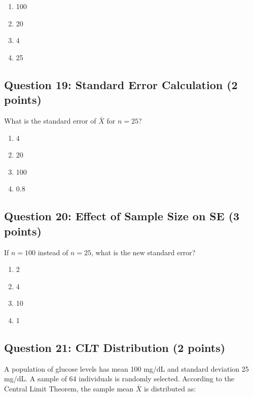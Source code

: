 \documentclass[11pt]{article}
\begin{document}
\begin{enumerate}[label=\Alph*)]
\item 100
\item 20
\item 4
\item 25
\end{enumerate}

\vspace{0.5cm}

\subsection*{Question 19: Standard Error Calculation (2 points)}

What is the standard error of $\bar{X}$ for $n=25$?

\begin{enumerate}[label=\Alph*)]
\item 4
\item 20
\item 100
\item 0.8
\end{enumerate}

\vspace{0.5cm}

\subsection*{Question 20: Effect of Sample Size on SE (3 points)}

If $n=100$ instead of $n=25$, what is the new standard error?

\begin{enumerate}[label=\Alph*)]
\item 2
\item 4
\item 10
\item 1
\end{enumerate}

\vspace{0.5cm}

\subsection*{Question 21: CLT Distribution (2 points)}

A population of glucose levels has mean 100 mg/dL and standard deviation 25 mg/dL. A sample of 64 individuals is randomly selected. According to the Central Limit Theorem, the sample mean $\bar{X}$ is distributed as:
\end{document}
